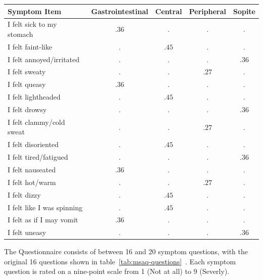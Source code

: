 \begin{center}
    \begin{tabular}{l c c c c}
        \toprule
        \textbf{Symptom Item} & \textbf{Gastrointestinal} & \textbf{Central} & \textbf{Peripheral} & \textbf{Sopite} \\
        \midrule
        I felt sick to my stomach  & $.36$ & $.$   & $.$   & $.$   \\
        I felt faint-like          & $.$   & $.45$ & $.$   & $.$   \\
        I felt annoyed/irritated   & $.$   & $.$   & $.$   & $.36$ \\
        I felt sweaty              & $.$   & $.$   & $.27$ & $.$   \\
        I felt queasy              & $.36$ & $.$   & $.$   & $.$   \\
        I felt lightheaded         & $.$   & $.45$ & $.$   & $.$   \\
        I felt drowsy              & $.$   & $.$   & $.$   & $.36$ \\
        I felt clammy/cold sweat   & $.$   & $.$   & $.27$ & $.$   \\
        I felt disoriented         & $.$   & $.45$ & $.$   & $.$   \\
        I felt tired/fatigued      & $.$   & $.$   & $.$   & $.36$ \\
        I felt nauseated           & $.36$ & $.$   & $.$   & $.$   \\
        I felt hot/warm            & $.$   & $.$   & $.27$ & $.$   \\
        I felt dizzy               & $.$   & $.45$ & $.$   & $.$   \\
        I felt like I was spinning & $.$   & $.45$ & $.$   & $.$   \\
        I felt as if I may vomit   & $.36$ & $.$   & $.$   & $.$   \\
        I felt uneasy              & $.$   & $.$   & $.$   & $.36$ \\
        \bottomrule
    \end{tabular}
    \label{tab:msaq-questions}
\end{center}
The Questionnaire consists of between 16 and 20 symptom questions, with the original 16 questions shown in
table~\ref{tab:msaq-questions}~\cite{Gianaros2001,Sevinc2020}.
Each symptom question is rated on a nine-point scale from 1 (Not at all) to 9 (Severly).
